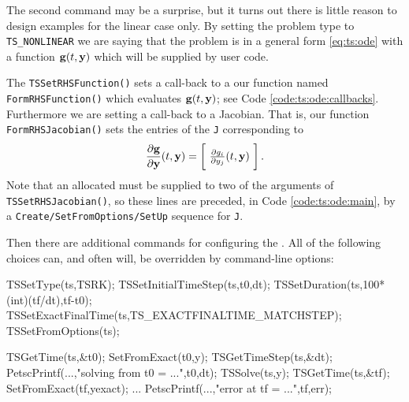 
The second command may be a surprise, but it turns out there is little reason to design \PETSc examples for the linear case only.  By setting the problem type to \texttt{TS\_NONLINEAR} we are saying that the  problem is in a general form \eqref{eq:ts:ode} with a function $\mathbf{g}(t,\mathbf{y})$ which will be supplied by user code.

The \texttt{TSSetRHSFunction()} sets a call-back to a our function named \texttt{FormRHSFunction()} which evaluates $\mathbf{g}(t,\mathbf{y})$; see Code \ref{code:ts:ode:callbacks}.  Furthermore we are setting a call-back to a Jacobian.  That is, our function \texttt{FormRHSJacobian()} sets the entries of the \pMat \texttt{J} corresponding to
    $$\frac{\partial \mathbf{g}}{\partial \mathbf{y}}(t,\mathbf{y}) = \begin{bmatrix}\phantom{\bigg|} \frac{\partial g_i}{\partial y_j}(t,\mathbf{y}) \phantom{\bigg|}\end{bmatrix}.$$
Note that an allocated \pMat must be supplied to two of the arguments of \texttt{TSSetRHSJacobian()}, so these \pTS lines are preceded, in Code \ref{code:ts:ode:main}, by a \texttt{Create/SetFromOptions/SetUp} sequence for \texttt{J}.

Then there are additional commands for configuring the \pTS.  All of the following choices can, and often will, be overridden by command-line options:
\begin{code}
  TSSetType(ts,TSRK);
  TSSetInitialTimeStep(ts,t0,dt);
  TSSetDuration(ts,100*(int)(tf/dt),tf-t0);
  TSSetExactFinalTime(ts,TS_EXACTFINALTIME_MATCHSTEP);
  TSSetFromOptions(ts);
\end{code}

\begin{code}
  TSGetTime(ts,&t0);
  SetFromExact(t0,y);
  TSGetTimeStep(ts,&dt);
  PetscPrintf(...,"solving from t0 = ...",t0,dt);
  TSSolve(ts,y);
  TSGetTime(ts,&tf);
  SetFromExact(tf,yexact);
  ...
  PetscPrintf(...,"error at tf = ...",tf,err);
\end{code}


